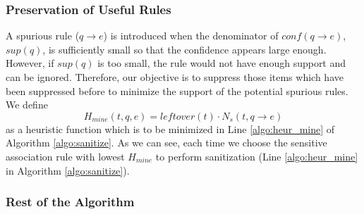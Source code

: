 %

\subsubsection{Preservation of Useful Rules}

A spurious rule ($q \rightarrow e$) is introduced when
the denominator of $conf(q \rightarrow e)$, $sup(q)$,
is sufficiently small so that the confidence appears large enough.
However, if $sup(q)$ is too small, the rule would not have enough
support and can be ignored.
Therefore, our objective is to suppress those items
which have been suppressed before to minimize the support of the
potential spurious rules.
%
We define
\[H_{mine}(t, q, e)=leftover(t)\cdot N_s(t, q\rightarrow e)\]
as a heuristic function which is to be minimized
in Line \ref{algo:heur_mine} of Algorithm \ref{algo:sanitize}.
%
As we can see, each time we choose the sensitive association rule with lowest
$H_{mine}$ to perform sanitization (Line \ref{algo:heur_mine} in Algorithm \ref{algo:sanitize}).

%
%
\subsubsection{Rest of the Algorithm}

